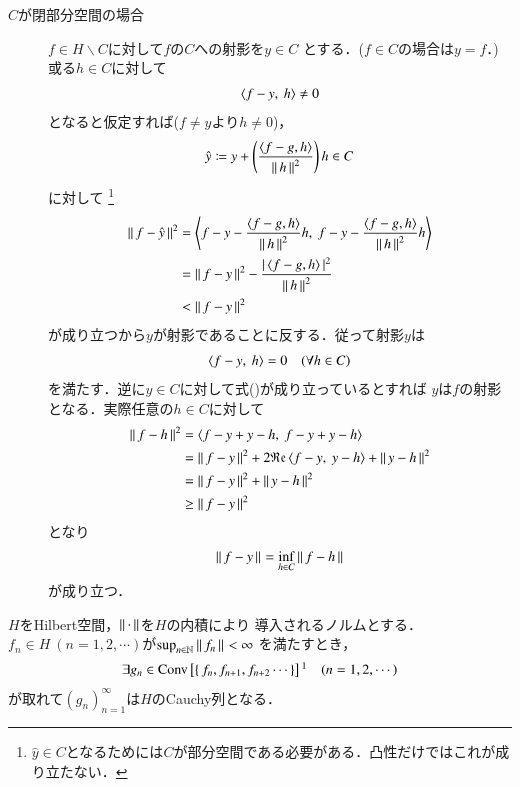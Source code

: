 \begin{prf}
\begin{description}
	\item[$C$が閉部分空間の場合]
		$f \in H \backslash C$に対して$f$の$C$への射影を$y \in C$
		とする．($f \in C$の場合は$y = f$．)或る$h \in C$に対して
		\begin{align}
			\inprod<f -y,\ h> \neq 0
		\end{align}
		となると仮定すれば($f \neq y$より$h \neq 0$)，
		\begin{align}
			\hat{y} \coloneqq y + \left( \frac{\inprod<f - g,h>}{\Norm{h}{}^2} \right)h \in C
		\end{align}
		に対して
		\footnote{
			$\hat{y} \in C$となるためには$C$が部分空間である必要がある．凸性だけではこれが成り立たない．
		}
		\begin{align}
			\Norm{f - \hat{y}}{}^2 
			&= \inprod<f - y - \frac{\inprod<f - g,h>}{\Norm{h}{}^2}h,\ f - y - \frac{\inprod<f - g,h>}{\Norm{h}{}^2}h> \\
			&= \Norm{f-y}{}^2 - \frac{|\inprod<f - g,h>|^2}{\Norm{h}{}^2} \\
			&< \Norm{f-y}{}^2
		\end{align}
		が成り立つから$y$が射影であることに反する．従って射影$y$は
		\begin{align}
			\inprod<f -y,\ h> = 0 \quad (\forall h \in C) \label{eq:projection}
		\end{align}
		を満たす．逆に$y \in C$に対して式()が成り立っているとすれば
		$y$は$f$の射影となる．実際任意の$h \in C$に対して
		\begin{align}
			\Norm{f - h}{}^2 &= \inprod<f - y + y - h,\ f - y + y - h> \\
			&= \Norm{f - y}{}^2 + 2 \Re{\inprod<f - y,\ y - h>} + \Norm{y - h}{}^2 \\
			&= \Norm{f - y}{}^2 + \Norm{y - h}{}^2 \\
			&\geq \Norm{f - y}{}^2
		\end{align}
		となり
		\begin{align}
			\left\|\, f - y\, \right\|_{} = \operatorname*{inf}_{h \in C} \left\|\, f - h\, \right\|_{}
		\end{align}
		が成り立つ．
		\QED
	\end{description}
\end{prf}

\begin{screen}
	\begin{thm}[Kolmosの補題]
		$H$をHilbert空間，$\left\|\, \cdot\, \right\|_{}$を$H$の内積により
		導入されるノルムとする．$f_n \in H\ (n=1,2,\cdots)$が$\operatorname*{sup}_{n \in \mathbb{N}} \left\|\, f_n\, \right\|_{} < \infty$
		を満たすとき，
		\begin{align}
			\exists g_n \in \Conv{f_n,f_{n+1},f_{n+2} \cdots}\footnotemark \quad (n=1,2,\cdots)
		\end{align}
		が取れて$(g_n)_{n=1}^{\infty}$は$H$のCauchy列となる．
	\end{thm}
\end{screen}

